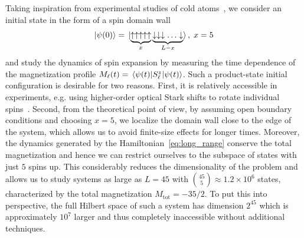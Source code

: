 Taking inspiration from experimental studies of cold atoms~\autocite{Joshi2022, Ronzheimer2013, Vidmar2013, Neyenhuis2017},
we consider an initial state in the form of a spin domain wall
\begin{equation}
  \ket{\psi(0)} = \ket*{\underbrace{\uparrow\uparrow\uparrow\uparrow\uparrow}_{x}
    \underbrace{\downarrow\downarrow\downarrow\ldots\downarrow}_{L-x}},\; x = 5
\end{equation}
and study the dynamics of spin expansion by measuring the time dependence of the magnetization profile
\(M_{\ell}(t) = \matrixel{\psi(t)}{\Sz_{\ell}}{\psi(t)}\). Such a product-state initial configuration is desirable for two reasons.
First, it is relatively accessible in experiments, e.g. using higher-order optical Stark shifts to rotate individual
spins~\autocite{Lee2016}. Second, from the theoretical point of view, by assuming open boundary conditions and
choosing \(x = 5\), we localize the domain wall close to the edge of the system, which allows us to avoid finite-size effects
for longer times. Moreover, the dynamics generated by the Hamiltonian~\eqref{eq:long_range} conserve the total magnetization
and hence we can restrict ourselves to the subspace of states with just \(5\) spins up. This considerably reduces
the dimensionality of the problem and allows us to study systems as large as \(L=45\) with
\(\binom{45}{5} \approx 1.2 \times 10^6\) states, characterized by the total magnetization \(M_{\mathrm{tot}} = -35/2\).
To put this into perspective, the full Hilbert space of such a system
has dimension \(2^{45}\) which is approximately \(10^7\) larger and thus completely inaccessible without additional techniques.

